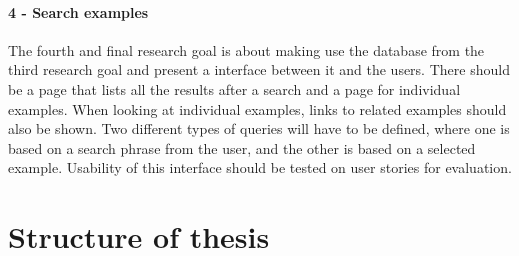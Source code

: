 \paragraph{4 - Search examples}
The fourth and final research goal is about making use the database from the third research goal and present a interface between it and the users. There should be a page that lists all the results after a search and a page for individual examples. When looking at individual examples, links to related examples should also be shown. Two different types of queries will have to be defined, where one is based on a search phrase from the user, and the other is based on a selected example. Usability of this interface should be tested on user stories for evaluation.


\section{Structure of thesis}
\cleardoublepage